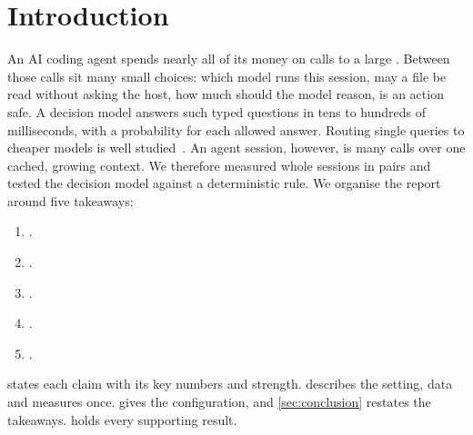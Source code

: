 \section{Introduction}\label{sec:intro}

An AI coding agent spends nearly all of its money on calls to a large . Between those calls sit many
small choices: which model runs this session, may a file be read without asking the host, how much should the model
reason, is an action safe. A decision model answers such typed questions in tens to hundreds of milliseconds, with a probability for each
allowed answer. Routing single queries to cheaper models is well studied~\cite{routellm,frugalgpt}. An agent session, however, is many
calls over one cached, growing context. We therefore measured whole sessions in pairs and tested the decision model
against a deterministic rule. We organise the report around five takeaways:
\begin{enumerate}[leftmargin=1.6em, itemsep=0pt, topsep=2pt]
  \item \textbf{} .
  \item \textbf{} .
  \item \textbf{} .
  \item \textbf{} .
  \item \textbf{} .
\end{enumerate}
 states each claim with its key numbers and strength.  describes the setting, data and measures once.  gives the configuration, and
\cref{sec:conclusion} restates the takeaways. \Thesupp{} holds every supporting result.
